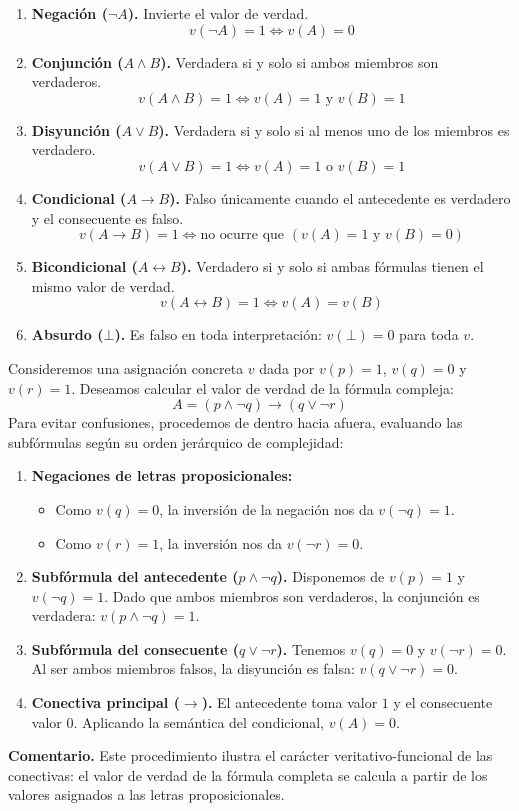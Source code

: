 \begin{enumerate}
    \item \textbf{Negación ($\neg A$).} Invierte el valor de verdad.
    \[
    v(\neg A) = 1 \iff v(A) = 0
    \]
    \item \textbf{Conjunción ($A \land B$).} Verdadera si y solo si ambos miembros son verdaderos.
    \[
    v(A \land B) = 1 \iff v(A) = 1 \text{ y } v(B) = 1
    \]
    \item \textbf{Disyunción ($A \lor B$).} Verdadera si y solo si al menos uno de los miembros es verdadero.
    \[
    v(A \lor B) = 1 \iff v(A) = 1 \text{ o } v(B) = 1
    \]
    \item \textbf{Condicional ($A \to B$).} Falso únicamente cuando el antecedente es verdadero y el consecuente es falso.
    \[
    v(A \to B) = 1 \iff \text{no ocurre que } (v(A) = 1 \text{ y } v(B) = 0)
    \]
    \item \textbf{Bicondicional ($A \leftrightarrow B$).} Verdadero si y solo si ambas fórmulas tienen el mismo valor de verdad.
    \[
    v(A \leftrightarrow B) = 1 \iff v(A) = v(B)
    \]
    \item \textbf{Absurdo ($\bot$).} Es falso en toda interpretación: $v(\bot) = 0$ para toda $v$.
\end{enumerate}

\begin{ejemplo}
Consideremos una asignación concreta $v$ dada por $v(p) = 1$, $v(q) = 0$ y $v(r) = 1$. Deseamos calcular el valor de verdad de la fórmula compleja:
\[
A = (p \land \neg q) \to (q \lor \neg r)
\]
Para evitar confusiones, procedemos de dentro hacia afuera, evaluando las subfórmulas según su orden jerárquico de complejidad:
\begin{enumerate}
    \item \textbf{Negaciones de letras proposicionales:}
    \begin{itemize}
        \item Como $v(q) = 0$, la inversión de la negación nos da $v(\neg q) = 1$.
        \item Como $v(r) = 1$, la inversión nos da $v(\neg r) = 0$.
    \end{itemize}
    \item \textbf{Subfórmula del antecedente ($p \land \neg q$).} Disponemos de $v(p) = 1$ y $v(\neg q) = 1$. Dado que ambos miembros son verdaderos, la conjunción es verdadera: $v(p \land \neg q) = 1$.
    \item \textbf{Subfórmula del consecuente ($q \lor \neg r$).} Tenemos $v(q) = 0$ y $v(\neg r) = 0$. Al ser ambos miembros falsos, la disyunción es falsa: $v(q \lor \neg r) = 0$.
    \item \textbf{Conectiva principal ($\to$).} El antecedente toma valor $1$ y el consecuente valor $0$. Aplicando la semántica del condicional, $v(A) = 0$.
\end{enumerate}
\textbf{Comentario.} Este procedimiento ilustra el carácter veritativo-funcional de las conectivas: el valor de verdad de la fórmula completa se calcula a partir de los valores asignados a las letras proposicionales.
\end{ejemplo}

